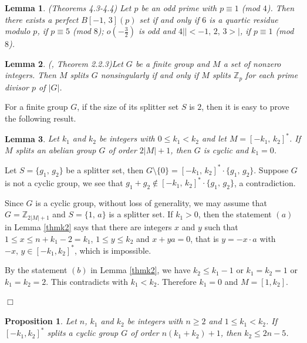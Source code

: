 \documentclass[12pt]{article}
\newtheorem{lem}{Lemma}[section]
\newtheorem{open problem}{Open problem}[section]
\newtheorem{prop}{Proposition}[section]
\newenvironment{proof}{\trivlist
      \item[\hskip\labelsep
      {\itshape Proof.}]\normalfont}
      {\hspace*{\fill}$\Box$\endtrivlist}
\begin{document}
\begin{lem}{\rm (\cite{[PK]}Theorems 4.3-4.4) }\label{lemH3}
Let $p$ be an odd prime with $p\equiv 1$ (mod $4$). Then there exists a perfect $B[-1, \,3](p)$ set
if and only if $6$ is a quartic residue \textit{modulo} $p$, if $p\equiv 5$ (mod $8$);
$o(-\frac{3}{2})$ is odd and $4||<-1, \, 2, \,3>|$, if $p\equiv 1$ (mod $8$).
\end{lem}

\begin{lem}{\rm (\cite{[H]}, Theorem 2.2.3)}\label{nonsingular}
Let $G$ be a finite group and $M$ a set of nonzero integers.
Then $M$ splits $G$ nonsingularly if and only if $M$ splits $\mathbb{Z}_p$ for each prime divisor $p$ of $|G|$.
\end{lem}

For a finite group $G$, if the size of its splitter set $S$ is $2$, then it is easy to prove the following result.
\begin{lem} \label{cyclic-2}
Let $k_1$ and $k_2$ be integers with  $0\le k_1< k_2$ and let $M=[-k_1, \,k_2]^*$.
If $M$ splits an abelian  group $G$ of order $2|M|+1$,
then  $G$ is cyclic and $k_1=0$.
\end{lem}

\begin{proof}
Let $S=\{g_1, \,g_2\}$ be  a splitter set,   then $G\setminus \{0\}=[-k_1, \,k_2]^\ast\cdot \{g_1, \,g_2\}$.
Suppose  $G$ is not a cyclic group, we see that $g_1+g_2\not\in [-k_1, \,k_2]^\ast\cdot \{g_1, \,g_2\}$, a contradiction.

Since $G$ is a cyclic group, without loss of generality, we may assume that $G=\mathbb{Z}_{2|M|+1}$ and  $S=\{1, \,a\}$ is a splitter set. If $k_1>0$, then the statement $(a)$ in Lemma \ref{thmk2} says that there are integers $x$ and $y$  such that $1\le x\le n+k_1-2=k_1$, $1\le y\le k_2$ and $x+ya=0$, that is $y=-x\cdot a$ with $-x, \,y\in [-k_1,k_2]^\ast$,  which is impossible.

By the statement $(b)$ in Lemma \ref{thmk2}, we have $k_2\leq k_1-1$ or $k_1=k_2=1$ or $k_1=k_2=2$. This contradicts with $k_1<k_2$. Therefore $k_1=0$ and $M=[1, k_2]$.

\end{proof}

\begin{prop} \label{thmin1}
Let $n$, $k_1$ and $k_2$ be integers with $n\geq 2$ and $1\leq k_1< k_2$.
If $[-k_1,k_2]^*$ splits a cyclic group $G$ of order $n(k_1+k_2)+1$,
then $k_2\leq 2n-5$.
\end{prop}
\end{document}
